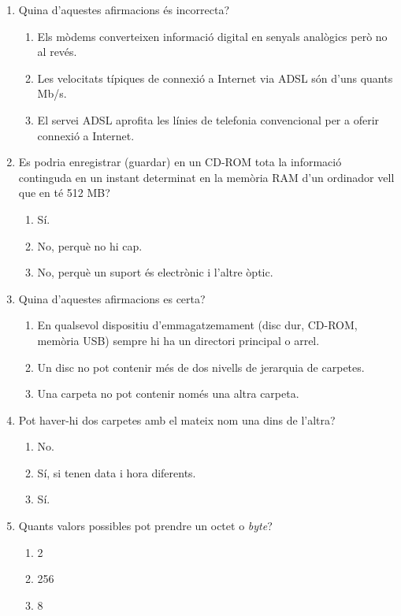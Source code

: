 \begin{enumerate}
\item Quina d'aquestes afirmacions és incorrecta?
  \begin{enumerate}
  \item Els mòdems converteixen informació digital en senyals
    analògics però no al revés.
  \item Les velocitats típiques de connexió a Internet via ADSL són
    d'uns quants Mb/s.
  \item El servei ADSL aprofita les línies de telefonia convencional
    per a oferir connexió a Internet.
  \end{enumerate}
  
\item Es podria enregistrar (guardar) en un CD-ROM tota la informació
  continguda en un instant determinat en la memòria RAM d'un ordinador
  vell que en té 512 MB?
  \begin{enumerate} 
  \item Sí.
  \item No, perquè no hi cap.
  \item No, perquè un suport és electrònic i l'altre òptic.
  \end{enumerate}

\item Quina d'aquestes afirmacions es certa?
  \begin{enumerate}
  \item En qualsevol dispositiu d'emmagatzemament (disc dur, CD-ROM,
    memòria USB) sempre hi ha un directori principal o arrel.
  \item Un disc no pot contenir més de dos nivells de jerarquia de
    carpetes.
  \item Una carpeta no pot contenir només una altra carpeta.
  \end{enumerate}

\item Pot haver-hi dos carpetes amb el mateix nom una dins de l'altra?
  \begin{enumerate}
  \item No.
  \item Sí, si tenen data i hora diferents.
  \item Sí.
  \end{enumerate}

\item Quants valors possibles pot prendre un octet o \emph{byte}?
  \begin{enumerate}
  \item 2
  \item 256
  \item 8
  \end{enumerate}


\end{enumerate}
